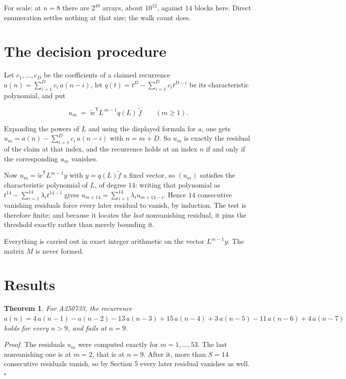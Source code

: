 \documentclass[11pt]{article}
\newtheorem{theorem}{Theorem}
\theoremstyle{definition}
\begin{document}
For scale: at $n = 8$ there are $2^{40}$ arrays, about $10^{12}$, against $14$ blocks here. Direct enumeration settles nothing at that size; the walk count does.

\section{The decision procedure}

Let $c_1,\dots,c_D$ be the coefficients of a claimed recurrence $a(n) = \sum_{i=1}^{D} c_i\,a(n-i)$, let $q(t) = t^{D} - \sum_{i=1}^{D} c_i t^{D-i}$ be its characteristic polynomial, and put

\[u_m \;=\; \tilde w^{\mathsf T} L^{\,m-1} q(L)\,\tilde f \qquad (m \ge 1).\]

Expanding the powers of $L$ and using the displayed formula for $a$, one gets $u_m = a(n) - \sum_{i=1}^{D} c_i\,a(n-i)$ with $n = m + D$. So $u_m$ is exactly the residual of the claim at that index, and the recurrence holds at an index $n$ if and only if the corresponding $u_m$ vanishes.

Now $u_m = \tilde w^{\mathsf T} L^{m-1} y$ with $y = q(L)\tilde f$ a fixed vector, so $(u_m)$ satisfies the characteristic polynomial of $L$, of degree $14$: writing that polynomial as $t^{14} - \sum_{i=1}^{14} \lambda_i t^{14-i}$ gives $u_{m+14} = \sum_{i=1}^{14} \lambda_i u_{m+14-i}$. Hence $14$ consecutive vanishing residuals force every later residual to vanish, by induction. The test is therefore finite; and because it locates the {\itshape last} nonvanishing residual, it pins the threshold exactly rather than merely bounding it.

Everything is carried out in exact integer arithmetic on the vector $L^{m-1}y$. The matrix $M$ is never formed.

\section{Results}

\begin{theorem} For A250733, the recurrence $a(n) = 4\,a(n-1) - a(n-2) - 13\,a(n-3) + 15\,a(n-4) + 3\,a(n-5) - 11\,a(n-6) + 4\,a(n-7)$ holds for every $n > 9$, and fails at $n = 9$.\end{theorem}

{\itshape Proof.} The residuals $u_m$ were computed exactly for $m = 1,\dots,53$. The last nonvanishing one is at $m = 2$, that is at $n = 9$. After it, more than $S = 14$ consecutive residuals vanish, so by Section 5 every later residual vanishes as well. $\square$
\end{document}
